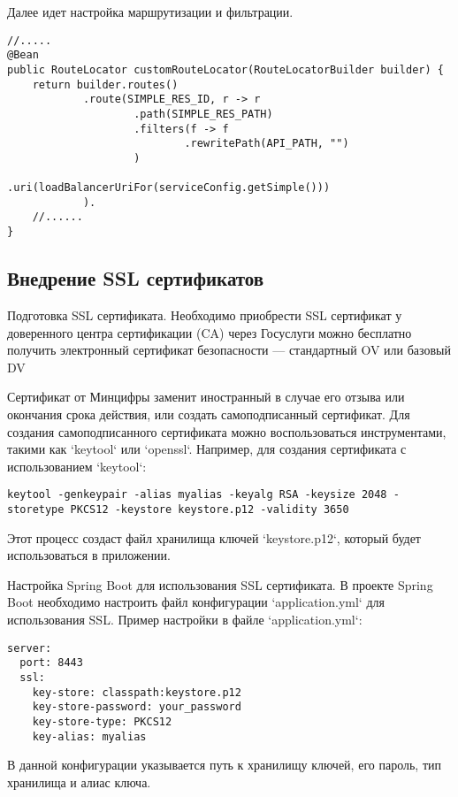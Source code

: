 Далее идет настройка маршрутизации и фильтрации.

\begin{lstlisting}
//.....
@Bean
public RouteLocator customRouteLocator(RouteLocatorBuilder builder) {
    return builder.routes()
            .route(SIMPLE_RES_ID, r -> r
                    .path(SIMPLE_RES_PATH)
                    .filters(f -> f
                            .rewritePath(API_PATH, "")
                    )
                    .uri(loadBalancerUriFor(serviceConfig.getSimple()))
            ).
    //......
}
\end{lstlisting}

\subsection{Внедрение SSL сертификатов}

Подготовка SSL сертификата.
Необходимо приобрести SSL сертификат у доверенного центра сертификации (CA) через Госуслуги можно бесплатно получить электронный сертификат безопасности — стандартный OV или базовый DV

Сертификат от Минцифры заменит иностранный в случае его отзыва или окончания срока действия, или создать самоподписанный сертификат.
Для создания самоподписанного сертификата можно воспользоваться инструментами, такими как `keytool` или `openssl`.
Например, для создания сертификата с использованием `keytool`:

\begin{lstlisting}
keytool -genkeypair -alias myalias -keyalg RSA -keysize 2048 -storetype PKCS12 -keystore keystore.p12 -validity 3650
\end{lstlisting}

Этот процесс создаст файл хранилища ключей `keystore.p12`, который будет использоваться в приложении.

Настройка Spring Boot для использования SSL сертификата.
В проекте Spring Boot необходимо настроить файл конфигурации `application.yml` для использования SSL. Пример настройки в файле `application.yml`:

\begin{lstlisting}
server:
  port: 8443
  ssl:
    key-store: classpath:keystore.p12
    key-store-password: your_password
    key-store-type: PKCS12
    key-alias: myalias
\end{lstlisting}

В данной конфигурации указывается путь к хранилищу ключей, его пароль, тип хранилища и алиас ключа.


